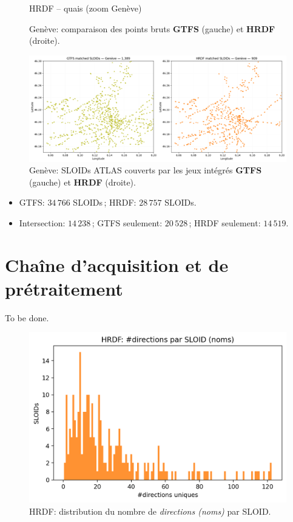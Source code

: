 \begin{figure}[H]
\begin{minipage}[t]{0.49\linewidth}
    \vspace{0.2em}
    \small HRDF – quais (zoom Genève)
  \end{minipage}
  \caption[Genève: GTFS vs HRDF (points bruts)]{Genève: comparaison des points bruts \textbf{GTFS} (gauche) et \textbf{HRDF} (droite).}
  \label{fig:geneva_gtfs_hrdf_raw}
\end{figure}

\begin{figure}[H]
  \centering
  \includegraphics[width=.95\linewidth]{figures/plots/geneva_matched_sloids_gtfs_hrdf.png}
  \caption[Genève: SLOIDs appariés (GTFS vs HRDF)]{Genève: SLOIDs ATLAS couverts par les jeux intégrés \textbf{GTFS} (gauche) et \textbf{HRDF} (droite).}
  \label{fig:geneva_matched_sloids}
\end{figure}

\begin{itemize}
  \item GTFS: \textit{\(34\,766\)} SLOIDs\,; HRDF: \textit{\(28\,757\)} SLOIDs.
  \item Intersection: \textit{\(14\,238\)}\,; GTFS seulement: \textit{\(20\,528\)}\,; HRDF seulement: \textit{\(14\,519\)}.
\end{itemize}


\section{Chaîne d’acquisition et de prétraitement}
To be done.
\begin{figure}[H]
  \centering
  \includegraphics[width=.7\linewidth]{figures/plots/hrdf_directions_per_sloid.png}
  \caption{HRDF: distribution du nombre de \textit{directions (noms)} par SLOID.}
\end{figure}